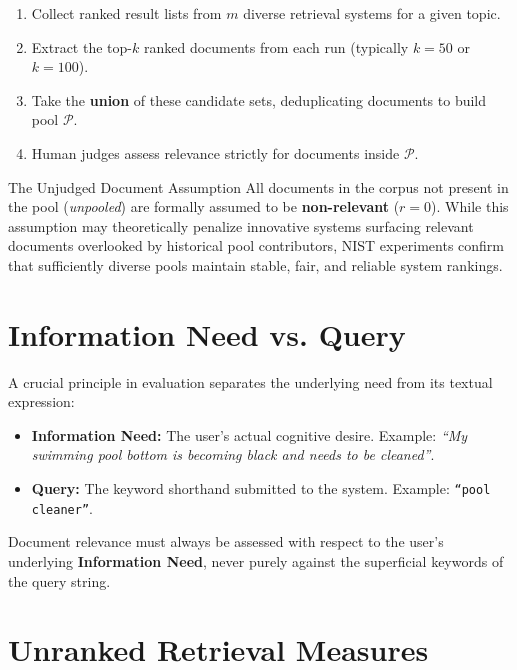 \begin{enumerate}
    \item Collect ranked result lists from $m$ diverse retrieval systems for a given topic.
    \item Extract the top-$k$ ranked documents from each run (typically $k = 50$ or $k = 100$).
    \item Take the \textbf{union} of these candidate sets, deduplicating documents to build pool $\mathcal{P}$.
    \item Human judges assess relevance strictly for documents inside $\mathcal{P}$.
\end{enumerate}

\begin{alertblock}{The Unjudged Document Assumption}
All documents in the corpus not present in the pool (\textit{unpooled}) are formally assumed to be \textbf{non-relevant} ($r = 0$).
While this assumption may theoretically penalize innovative systems surfacing relevant documents overlooked by historical pool contributors, NIST experiments confirm that sufficiently diverse pools maintain stable, fair, and reliable system rankings.
\end{alertblock}

\FloatBarrier
\section{Information Need vs. Query}

A crucial principle in evaluation separates the underlying need from its textual expression:
\begin{itemize}
    \item \textbf{Information Need:} The user's actual cognitive desire. Example: \textit{``My swimming pool bottom is becoming black and needs to be cleaned''}.
    \item \textbf{Query:} The keyword shorthand submitted to the system. Example: \texttt{``pool cleaner''}.
\end{itemize}
\begin{property}
Document relevance must always be assessed with respect to the user's underlying \textbf{Information Need}, never purely against the superficial keywords of the query string.
\end{property}

\FloatBarrier
\section{Unranked Retrieval Measures}

